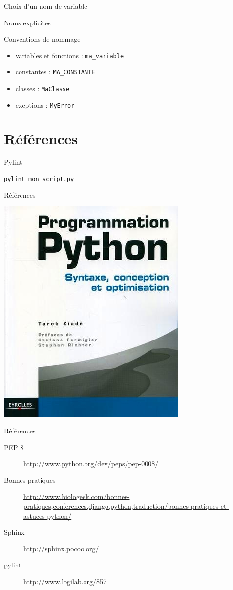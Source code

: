 \documentclass[xcolor=pdftex,dvipsnames,table,handout]{beamer}
\begin{document}
\begin{frame}{Choix d'un nom de variable}
\begin{center}
\Huge{Noms explicites}
\end{center}
\end{frame}

\begin{frame}{Conventions de nommage}
\begin{itemize}
    \item variables et fonctions : \texttt{ma\_variable}
    \item constantes : \texttt{MA\_CONSTANTE}
    \item classes : \texttt{MaClasse}
    \item exeptions : \texttt{MyError}
\end{itemize}
\end{frame}

\section{Références}

\begin{frame}{Pylint}
\begin{center}
\Large{\texttt{pylint mon\_script.py}}
\end{center}
\end{frame}

\begin{frame}{Références}
\begin{center}
\includegraphics[width=0.5\linewidth]{img/pp}
\end{center}
\end{frame}

\begin{frame}{Références}
\begin{description}
    \item[PEP 8] \url{http://www.python.org/dev/peps/pep-0008/}
    \item[Bonnes pratiques] \url{http://www.biologeek.com/bonnes-pratiques,conferences,django,python,traduction/bonnes-pratiques-et-astuces-python/}
    \item[Sphinx] \url{http://sphinx.pocoo.org/}
    \item[pylint] \url{http://www.logilab.org/857}
\end{description}
\end{frame}
\end{document}
